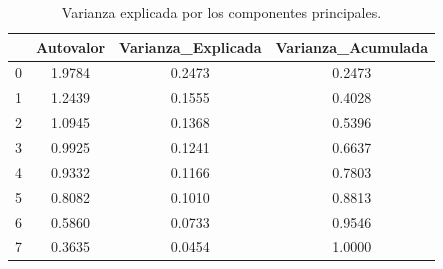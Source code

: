 \begin{table}[h]
\centering
\caption{Varianza explicada por los componentes principales.}
\label{tab:pca_varianza}
\begin{tabular}{lccc}
\toprule
 & Autovalor & Varianza\_Explicada & Varianza\_Acumulada \\
\midrule
0 & 1.9784 & 0.2473 & 0.2473 \\
1 & 1.2439 & 0.1555 & 0.4028 \\
2 & 1.0945 & 0.1368 & 0.5396 \\
3 & 0.9925 & 0.1241 & 0.6637 \\
4 & 0.9332 & 0.1166 & 0.7803 \\
5 & 0.8082 & 0.1010 & 0.8813 \\
6 & 0.5860 & 0.0733 & 0.9546 \\
7 & 0.3635 & 0.0454 & 1.0000 \\
\bottomrule
\end{tabular}
\end{table}
